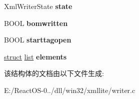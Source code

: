 \begin{DoxyCompactItemize}
\item 
\mbox{\label{struct__xmlwriter_a60b3a97e79eb77a2c929fe0e4ab381cb}} 
Xml\+Writer\+State {\bfseries state}
\item 
\mbox{\label{struct__xmlwriter_a750c7f10a363d24b4b8919dbe0a5d7a0}} 
B\+O\+OL {\bfseries bomwritten}
\item 
\mbox{\label{struct__xmlwriter_a61000eb9fd9bef4d26276869368b6cd5}} 
B\+O\+OL {\bfseries starttagopen}
\item 
\mbox{\label{struct__xmlwriter_a2f9a7c4c674b0861d3ec15150376057e}} 
\hyperlink{interfacestruct}{struct} \hyperlink{classlist}{list} {\bfseries elements}
\end{DoxyCompactItemize}


该结构体的文档由以下文件生成\+:\begin{DoxyCompactItemize}
\item 
E\+:/\+React\+O\+S-\/0../dll/win32/xmllite/writer.\+c\end{DoxyCompactItemize}
